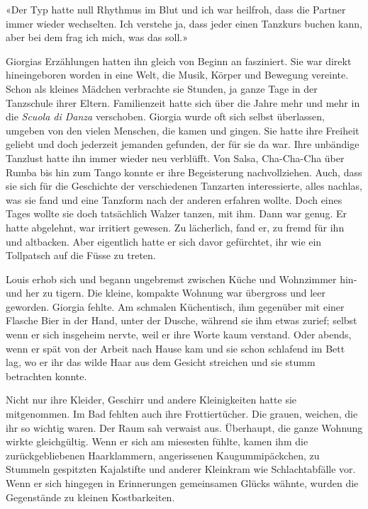 «Der Typ hatte null Rhythmus im Blut und ich war heilfroh, dass die Partner immer wieder wechselten. Ich verstehe ja, dass jeder einen Tanzkurs buchen kann, aber bei dem frag ich mich, was das soll.»

Giorgias Erzählungen hatten ihn gleich von Beginn an fasziniert. Sie war direkt hineingeboren worden in eine Welt, die Musik, Körper und Bewegung vereinte. Schon als kleines Mädchen verbrachte sie Stunden, ja ganze Tage in der Tanzschule ihrer Eltern. Familienzeit hatte sich über die Jahre mehr und mehr in die \emph{Scuola di Danza} verschoben. Giorgia wurde oft sich selbst überlassen, umgeben von den vielen Menschen, die kamen und gingen. Sie hatte ihre Freiheit geliebt und doch jederzeit jemanden gefunden, der für sie da war. Ihre unbändige Tanzlust hatte ihn immer wieder neu verblüfft. Von Salsa, Cha-Cha-Cha über Rumba bis hin zum Tango konnte er ihre Begeisterung nachvollziehen. Auch, dass sie sich für die Geschichte der verschiedenen Tanzarten interessierte, alles nachlas, was sie fand und eine Tanzform nach der anderen erfahren wollte. Doch eines Tages wollte sie doch tatsächlich Walzer tanzen, mit ihm. Dann war genug. Er hatte abgelehnt, war irritiert gewesen. Zu lächerlich, fand er, zu fremd für ihn und altbacken. Aber eigentlich hatte er sich davor gefürchtet, ihr wie ein Tollpatsch auf die Füsse zu treten.

Louis erhob sich und begann ungebremst zwischen Küche und Wohnzimmer hin- und her zu tigern. Die kleine, kompakte Wohnung war übergross und leer geworden. Giorgia fehlte. Am schmalen Küchentisch, ihm gegenüber mit einer Flasche Bier in der Hand, unter der Dusche, während sie ihm etwas zurief; selbst wenn er sich insgeheim nervte, weil er ihre Worte kaum verstand. Oder abends, wenn er spät von der Arbeit nach Hause kam und sie schon schlafend im Bett lag, wo er ihr das wilde Haar aus dem Gesicht streichen und sie stumm betrachten konnte.

Nicht nur ihre Kleider, Geschirr und andere Kleinigkeiten hatte sie mitgenommen. Im Bad fehlten auch ihre Frottiertücher. Die grauen, weichen, die ihr so wichtig waren. Der Raum sah verwaist aus. Überhaupt, die ganze Wohnung wirkte gleichgültig. Wenn er sich am miesesten fühlte, kamen ihm die zurückgebliebenen Haarklammern, angerissenen Kaugummipäckchen, zu Stummeln gespitzten Kajalstifte und anderer Kleinkram wie Schlachtabfälle vor. Wenn er sich hingegen in Erinnerungen gemeinsamen Glücks wähnte, wurden die Gegenstände zu  kleinen Kostbarkeiten.

\sectionbreak

